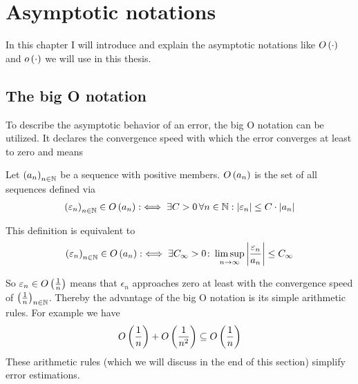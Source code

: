 \chapter{Asymptotic notations} \label{chapter:tools}

In this chapter I will introduce and explain the asymptotic notations like $O\left( {\cdot} \right)$ and $o\left( {\cdot} \right)$ we will use in this thesis.

\section{The big O notation}

To describe the asymptotic behavior of an error, the big O notation can be utilized. It declares the convergence speed with which the error converges at least to zero and means~\cite[p. 444]{graham}\cite[p.~100]{aigner}

\begin{definition}
  Let $\left({a_n}\right)_{{n}\in\mathbb N}$ be a sequence with positive members. $O\left( {a_n} \right)$ is the set of all sequences defined via
  \begin{align} \label{bigo_def1}
    \left({\varepsilon_n}\right)_{{n}\in\mathbb N} \in O\left( {a_n} \right) :\iff \exists C > 0\, \forall n\in \mathbb N: \left|{\varepsilon_n}\right| \le C \cdot \left|{a_n}\right|
  \end{align}
\end{definition}

\noindent This definition is equivalent to~\cite[p.~383]{hachenberger}\cite{wiki:bigo}
\begin{align} \label{bigo_def_limsup}
  \left({\varepsilon_n}\right)_{{n}\in\mathbb N} \in O\left( {a_n} \right) :\iff \exists C_\infty > 0 \colon\limsup_{n\to\infty} \left|{\frac{\varepsilon_n}{a_n}}\right| \le C_\infty
\end{align}

So $\varepsilon_n \in O\left( {\frac 1n} \right)$ means that $\epsilon_n$ approaches zero at least with the convergence speed of $\left({\frac 1n}\right)_{{n}\in\mathbb N}$. Thereby the advantage of the big O notation is its simple arithmetic rules. For example we have
\begin{align}
  O\left( {\frac 1n} \right) + O\left( {\frac 1{n^2}} \right) \subseteq O\left( {\frac 1n} \right)
\end{align}
These arithmetic rules (which we will discuss in the end of this section) simplify error estimations.

